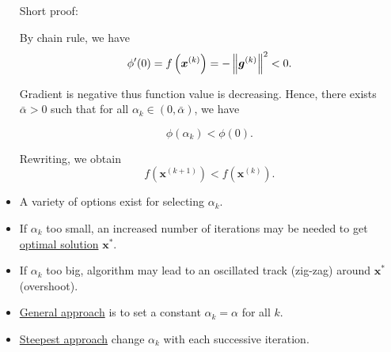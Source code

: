 \documentclass[12pt,thmsa]{article}
\begin{document}
\begin{itemize}
	Short proof: 
	
	By chain rule, we have
	\[
		\phi^{\prime}(0)= f\left(\boldsymbol{x}^{(k)}\right) = -\left\| { \color{black}\boldsymbol{g}^{(k)} } \right\|^{2}<0 .
	\]

	Gradient is negative thus function value is decreasing. Hence, there exists \(\bar{\alpha}>0\) such that for all \(\alpha_{k} \in(0, \bar{\alpha})\), we have

	\[
		\phi\left(\alpha_{k}\right)<\phi(0) .
	\]

	Rewriting, we obtain
	\[
		f\left(\boldsymbol{x}^{(k+1)}\right)<f\left(\boldsymbol{x}^{(k)}\right).
	\]

	\item A variety of options exist for selecting \(\alpha_{k}\).
	
	\item If \(\alpha_{k}\) too small, an increased number of iterations may be needed to get \underline{optimal solution} \(\boldsymbol{x}^{*}\).
	
	\item If \(\alpha_{k}\) too big, algorithm may lead to an oscillated track (zig-zag) around \(\boldsymbol{x}^{*}\) (overshoot).
	
	\item \underline{General approach} is to set a constant \(\alpha_{k}=\alpha\) for all \(k\).
	
	\item \underline{Steepest approach} change \(\alpha_{k}\) with each successive iteration.
		
\end{itemize}


\end{document}
